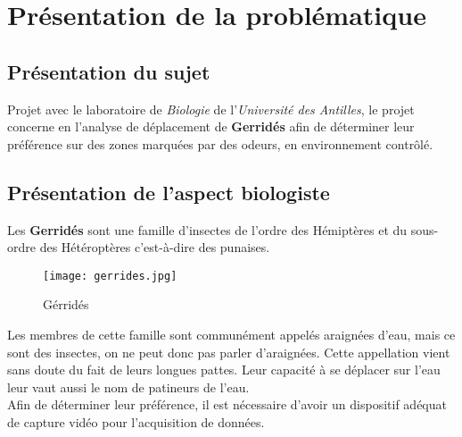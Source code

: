 \chapter{Présentation de la problématique}
    \section{Présentation du sujet}
    Projet avec le laboratoire de \textit{Biologie} de l'\textit{Université des Antilles}, le projet concerne en l'analyse de déplacement de \textbf{Gerridés} afin de déterminer leur préférence sur des zones marquées par des odeurs, en environnement contrôlé.


    \section{Présentation de l'aspect biologiste}
    Les \textbf{Gerridés} sont une famille d'insectes de l'ordre des Hémiptères et du sous-ordre des Hétéroptères c'est-à-dire des punaises.
    \begin{figure}[ht]
        \centering
        \texttt{[image: gerrides.jpg]}
        \caption{Gérridés}        
    \end{figure}

    \vspace{0.1cm}

    \begin{flushleft}
        Les membres de cette famille sont communément appelés araignées d’eau, mais ce sont des insectes, on ne peut donc pas parler d'araignées. Cette appellation vient sans doute du fait de leurs longues pattes. Leur capacité à se déplacer sur l'eau leur vaut aussi le nom de patineurs de l'eau.\\[0.1cm]

        Afin de déterminer leur préférence, il est nécessaire d'avoir un dispositif adéquat de capture vidéo pour l'acquisition de données.
    \end{flushleft}
        


